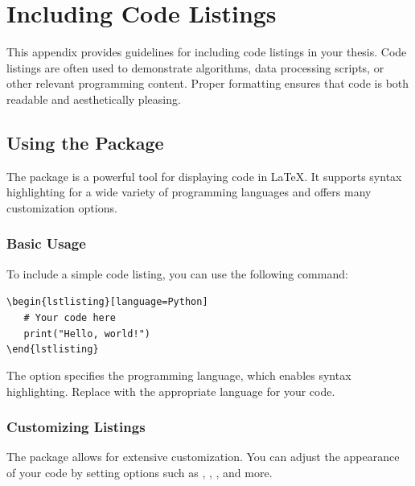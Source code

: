 \chapter{Including Code Listings}\label{app:codelistings}
	This appendix provides guidelines for including code listings in your thesis. 
	Code listings are often used to demonstrate algorithms, data processing scripts, or other relevant programming content. 
	Proper formatting ensures that code is both readable and aesthetically pleasing.

	\section{Using the  Package}
		The  package is a powerful tool for displaying code in LaTeX. 
		It supports syntax highlighting for a wide variety of programming languages and offers many customization options.

		\subsection{Basic Usage}

			To include a simple code listing, you can use the following command:

\noindent\lstinline[basicstyle=\ttfamily]|\begin{lstlisting}[language=Python]|\\[-0.7em]
\lstinline[basicstyle=\ttfamily]|	# Your code here|\\[-0.7em]
\lstinline[basicstyle=\ttfamily]|	print("Hello, world!")|\\[-0.7em]
\lstinline[basicstyle=\ttfamily]|\end{lstlisting}|

			The  option specifies the programming language, which enables syntax highlighting. 
			Replace  with the appropriate language for your code.


		\subsection{Customizing Listings}

			The  package allows for extensive customization. 
			You can adjust the appearance of your code by setting options such as , , , and more.

